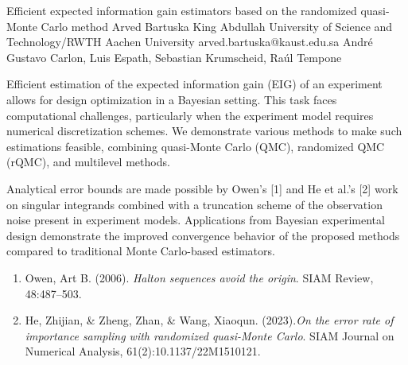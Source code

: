 \begin{talk}
  {Efficient expected information gain estimators based on the randomized quasi-Monte Carlo method}%
  {Arved Bartuska}%
  {King Abdullah University of Science and Technology/RWTH Aachen University}%
  {arved.bartuska@kaust.edu.sa}%
  {Andr\'{e} Gustavo Carlon, Luis Espath, Sebastian Krumscheid, Ra\'{u}l Tempone}%
  
    
   
Efficient estimation of the expected information gain (EIG) of an experiment allows for design optimization in a Bayesian setting. This task faces computational challenges, particularly when the experiment model requires numerical discretization schemes. We demonstrate various methods to make such estimations feasible, combining quasi-Monte Carlo (QMC), randomized QMC (rQMC), and multilevel methods.

Analytical error bounds are made possible by Owen's [1] and He et al.'s [2] work on singular integrands combined with a truncation scheme of the observation noise present in experiment models. Applications from Bayesian experimental design demonstrate the improved convergence behavior of the proposed methods compared to traditional Monte Carlo-based estimators.

\medskip

\begin{enumerate}
 \item[{[1]}] Owen, Art B. (2006). {\it Halton sequences avoid the origin}. SIAM Review, 48:487--503.
 \item[{[2]}] He, Zhijian, \& Zheng, Zhan, \& Wang, Xiaoqun. (2023).{\it On the error rate of importance sampling with randomized quasi-Monte Carlo}. SIAM Journal
on Numerical Analysis,  61(2):10.1137/22M1510121.
\end{enumerate}

\end{talk}
